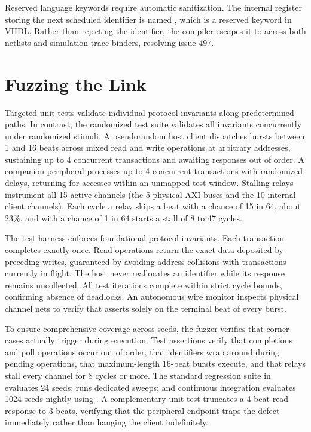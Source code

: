 \documentclass[journal,9pt]{IEEEtran}
\newcommand{\fuzzpart}[3]{%
}
\begin{document}
Reserved language keywords require automatic sanitization. The internal
register storing the next scheduled identifier is named , which
is a reserved keyword in VHDL. Rather than rejecting the identifier, the
compiler escapes it to  across both netlists and simulation
trace binders, resolving issue 497.

\section{Fuzzing the Link}
\label{sec:a-fuzz}

Targeted unit tests validate individual protocol invariants along
predetermined paths. In contrast, the randomized test suite
 validates all invariants concurrently under randomized
stimuli. A pseudorandom host client dispatches bursts between 1 and 16 beats
across mixed read and write operations at arbitrary addresses, sustaining up
to 4 concurrent transactions and awaiting responses out of order. A companion
peripheral processes up to 4 concurrent transactions with randomized delays,
returning  for accesses within an unmapped test window.
Stalling relays instrument all 15 active channels (the 5 physical AXI buses
and the 10 internal client channels). Each cycle a relay skips a beat with
a chance of 15 in 64, about 23\%, and with a chance of 1 in 64 starts a
stall of 8 to 47 cycles.

\fuzzpart{relay}{A relay, from
\code{lib/parts/src/bus/axi/fuzz.rs}.}{lst:a-relay}

The test harness enforces foundational protocol invariants. Each transaction
completes exactly once. Read operations return the exact data deposited by
preceding writes, guaranteed by avoiding address collisions with transactions
currently in flight. The host never reallocates an identifier while its
response remains uncollected. All test iterations complete within strict
cycle bounds, confirming absence of deadlocks. An autonomous wire monitor
inspects physical channel nets to verify that  asserts solely on
the terminal beat of every burst.

\fuzzpart{monitor}{The monitor of the AXI channels.}{lst:a-monitor}

To ensure comprehensive coverage across seeds, the fuzzer verifies that
corner cases actually trigger during execution. Test assertions verify that
completions and poll operations occur out of order, that identifiers wrap
around during pending operations, that maximum-length 16-beat bursts
execute, and that relays stall every channel for 8 cycles or more. The
standard regression suite in  evaluates 24
seeds;  runs dedicated sweeps; and
continuous integration evaluates 1024 seeds nightly using
. A complementary unit test truncates a 4-beat read
response to 3 beats, verifying that the peripheral endpoint traps the defect
immediately rather than hanging the client indefinitely.
\end{document}
